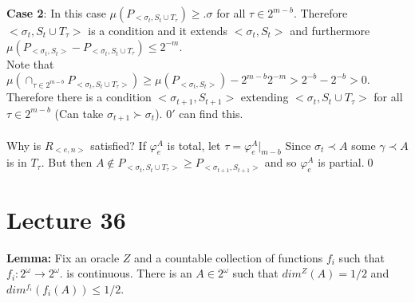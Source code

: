 \documentclass{article}
\begin{document}
   \textbf{Case 2}: In this case $\mu(P_{<\sigma_t,S_t\cup T_\tau}) \geq .\sigma$ for all $\tau \in 2^{m-b}$. Therefore $<\sigma_t , S_t\cup T_\tau>$ is a condition and it extends $<\sigma_t,S_t>$ and furthermore $\mu(P_{<\sigma_t,S_t>}- P_{<\sigma_t,S_t\cup T_\tau}) \leq 2^{-m}$. \\
   Note that $\mu(\cap_{\tau \in 2^{m-b} }P_{<\sigma_t,S_t\cup T_\tau>}) \geq \mu(P_{<\sigma_t,S_t>}) - 2^{m-b}2^{-m} > 2^{-b} - 2^{-b} > 0$. \\
   Therefore there is a condition $<\sigma_{t+1}, S_{t+1}>$ extending $<\sigma_t, S_t \cup T_\tau>$ for all $\tau \in 2^{m-b}$ (Can take $\sigma_{t+1} \succ \sigma_t$). $0'$ can find this.\\\\
   Why is $R_{<e,n>}$ satisfied? If $\varphi_e^A$ is total, let $\tau = \varphi^A_e|_{m-b}$ Since $\sigma_t \prec A$ some $\gamma \prec A$ is in $T_\tau$. But then $A \not \in P_{<\sigma_t,S_t\cup T_\tau>} \geq P_{<\sigma_{t+1}, S_{t+1}>}$ and so $\varphi_e^A$ is partial.\qed \\
     \newpage
   \section{Lecture 36}
   
   \textbf{Lemma:} Fix an oracle $Z$ and a countable collection of functions $f_i$ such that $f_i: 2^\omega \to 2^\omega$. is continuous. There is an $A \in 2^\omega$ such that $dim^Z(A) = 1/2$ and $dim^{f_i}(f_i(A)) \leq 1/2$.\\
 
\end{document}
